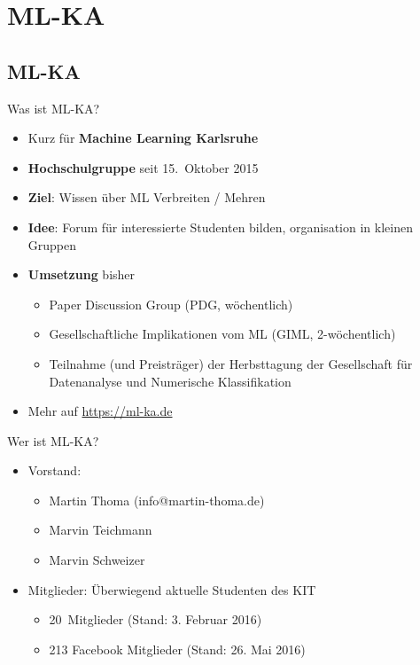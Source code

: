 \documentclass{beamer}
\begin{document}

\title{\titleText}
\date{\href{http://tinyurl.com/ml-intro-pg}{tinyurl.com/ml-intro-pg}}
\subject{Machine Learning}

\frame{\titlepage}

\section{ML-KA}
\subsection{ML-KA}
\begin{frame}{Was ist ML-KA?}
    \begin{itemize}
        \item Kurz für \textbf{Machine Learning Karlsruhe}
        \item \textbf{Hochschulgruppe} seit 15.~Oktober 2015
        \item \textbf{Ziel}: Wissen über ML Verbreiten / Mehren
        \item \textbf{Idee}: Forum für interessierte Studenten bilden,
              organisation in kleinen Gruppen
        \item \textbf{Umsetzung} bisher
        \begin{itemize}
            \item Paper Discussion Group (PDG, wöchentlich)
            \item Gesellschaftliche Implikationen vom ML (GIML, 2-wöchentlich)
            \item Teilnahme (und Preisträger) der Herbsttagung der Gesellschaft
                  für Datenanalyse und Numerische Klassifikation
        \end{itemize}
        \item Mehr auf \href{https://ml-ka.de/}{https://ml-ka.de}
    \end{itemize}
\end{frame}

\begin{frame}{Wer ist ML-KA?}
    \begin{itemize}
        \item Vorstand:
        \begin{itemize}
            \item Martin Thoma (info@martin-thoma.de)
            \item Marvin Teichmann
            \item Marvin Schweizer
        \end{itemize}
        \item Mitglieder: Überwiegend aktuelle Studenten des KIT
        \begin{itemize}
            \item 20~Mitglieder (Stand: 3. Februar 2016)
            \item 213 Facebook Mitglieder (Stand: 26. Mai 2016)
        \end{itemize}
    \end{itemize}
\end{frame}
\end{document}
